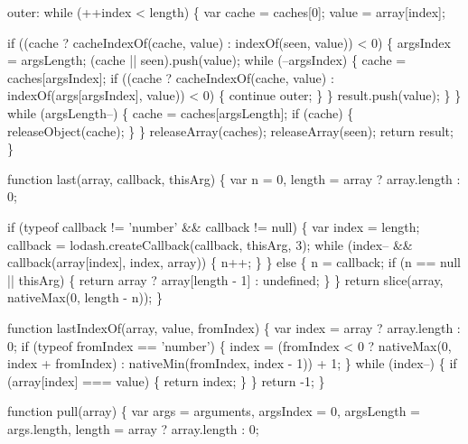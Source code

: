 \begin{DoxyCodeInclude}
      outer:
      \textcolor{keywordflow}{while} (++index < length) \{
        var cache = caches[0];
        value = array[index];

        \textcolor{keywordflow}{if} ((cache ? cacheIndexOf(cache, value) : indexOf(seen, value)) < 0) \{
          argsIndex = argsLength;
          (cache || seen).push(value);
          \textcolor{keywordflow}{while} (--argsIndex) \{
            cache = caches[argsIndex];
            \textcolor{keywordflow}{if} ((cache ? cacheIndexOf(cache, value) : indexOf(args[argsIndex], value)) < 0) \{
              \textcolor{keywordflow}{continue} outer;
            \}
          \}
          result.push(value);
        \}
      \}
      \textcolor{keywordflow}{while} (argsLength--) \{
        cache = caches[argsLength];
        \textcolor{keywordflow}{if} (cache) \{
          releaseObject(cache);
        \}
      \}
      releaseArray(caches);
      releaseArray(seen);
      \textcolor{keywordflow}{return} result;
    \}

    \textcolor{keyword}{function} last(array, callback, thisArg) \{
      var n = 0,
          length = array ? array.length : 0;

      \textcolor{keywordflow}{if} (typeof callback != \textcolor{stringliteral}{'number'} && callback != null) \{
        var index = length;
        callback = lodash.createCallback(callback, thisArg, 3);
        \textcolor{keywordflow}{while} (index-- && callback(array[index], index, array)) \{
          n++;
        \}
      \} \textcolor{keywordflow}{else} \{
        n = callback;
        \textcolor{keywordflow}{if} (n == null || thisArg) \{
          \textcolor{keywordflow}{return} array ? array[length - 1] : undefined;
        \}
      \}
      \textcolor{keywordflow}{return} slice(array, nativeMax(0, length - n));
    \}

    \textcolor{keyword}{function} lastIndexOf(array, value, fromIndex) \{
      var index = array ? array.length : 0;
      \textcolor{keywordflow}{if} (typeof fromIndex == \textcolor{stringliteral}{'number'}) \{
        index = (fromIndex < 0 ? nativeMax(0, index + fromIndex) : nativeMin(fromIndex, index - 1)) + 1;
      \}
      \textcolor{keywordflow}{while} (index--) \{
        \textcolor{keywordflow}{if} (array[index] === value) \{
          \textcolor{keywordflow}{return} index;
        \}
      \}
      \textcolor{keywordflow}{return} -1;
    \}

    \textcolor{keyword}{function} pull(array) \{
      var args = arguments,
          argsIndex = 0,
          argsLength = args.length,
          length = array ? array.length : 0;


\end{DoxyCodeInclude}
